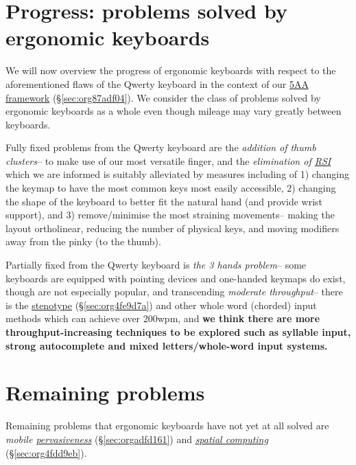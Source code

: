 \documentclass[logo,bsc,singlespacing,parskip]{infthesis}
\begin{document}
\section{Progress: problems solved by ergonomic keyboards}
\label{sec:org430e1d4}
We will now overview the progress of ergonomic keyboards with respect to the aforementioned flaws of the Qwerty keyboard in the context of our \hyperref[sec:org87adf04]{5AA framework} (\S  \ref{sec:org87adf04}).
We consider the class of problems solved by ergonomic keyboards as a whole even though mileage may vary greatly between keyboards.

Fully fixed problems from the Qwerty keyboard are the \emph{addition of thumb clusters}-- to make use of our most versatile finger,  and the \emph{elimination of \hyperref[org503fc2d]{RSI}} which we are informed is suitably alleviated by measures including of 1) changing the keymap to have the most common keys most easily accessible, 2) changing the shape of the keyboard to better fit the natural hand (and provide wrist support), and 3) remove/minimise the most straining movements-- making the layout ortholinear, reducing the number of physical keys, and moving modifiers away from the pinky (to the thumb).

Partially fixed from the Qwerty keyboard is \emph{the 3 hands problem}-- some keyboards are equipped with pointing devices and one-handed keymaps do exist, though are not especially popular, and transcending \emph{moderate throughput}-- there is the  \hyperref[sec:org4fe9d7a]{stenotype} (\S  \ref{sec:org4fe9d7a}) and other whole word (chorded) input methods which can achieve over 200wpm, and \textbf{we think there are more throughput-increasing techniques to be explored such as syllable input, strong autocomplete and mixed letters/whole-word input systems.}

\section{Remaining problems}
\label{sec:orgb64ce5b}
Remaining problems that ergonomic keyboards have not yet at all solved are \emph{mobile \hyperref[sec:orgadfd161]{pervasiveness}} (\S  \ref{sec:orgadfd161}) and \emph{\hyperref[sec:org4fdd9eb]{spatial computing}} (\S  \ref{sec:org4fdd9eb}).
\end{document}
